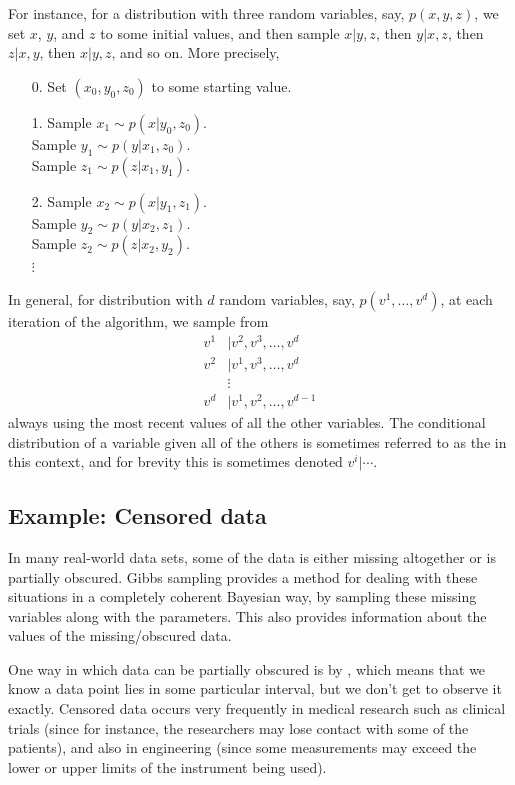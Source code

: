 \documentclass[12pt]{article}
\begin{document}
For instance, for a distribution with three random variables, say, $p(x,y,z)$, we set $x$, $y$, and $z$ to some initial values, and then sample $x|y,z$, then $y|x,z$, then $z|x,y$, then $x|y,z$, and so on. More precisely,
\begin{enumerate}
\item[0.] Set $(x_0,y_0,z_0)$ to some starting value.
\item[1.] Sample $x_1\sim p(x|y_0,z_0)$. \\
          Sample $y_1\sim p(y|x_1,z_0)$. \\
          Sample $z_1\sim p(z|x_1,y_1)$. \\
\item[2.] Sample $x_2\sim p(x|y_1,z_1)$. \\
          Sample $y_2\sim p(y|x_2,z_1)$. \\
          Sample $z_2\sim p(z|x_2,y_2)$. \\
        $\vdots$
\end{enumerate}

In general, for distribution with $d$ random variables, say, $p(v^1,\ldots,v^d)$, at each iteration of the algorithm, we sample from
\begin{align*}
v^1&\mid v^2,v^3,\ldots,v^d\\
v^2&\mid v^1,v^3,\ldots,v^d\\
&\vdots\\
v^d&\mid v^1,v^2,\ldots,v^{d-1}
\end{align*}
always using the most recent values of all the other variables. The conditional distribution of a variable given all of the others is sometimes referred to as the  in this context, and for brevity this is sometimes denoted $v^i|\cdots$.




\subsection{Example: Censored data}
In many real-world data sets, some of the data is either missing altogether or is partially obscured. Gibbs sampling provides a method for dealing with these situations in a completely coherent Bayesian way, by sampling these missing variables along with the parameters. This also provides information about the values of the missing/obscured data.

One way in which data can be partially obscured is by , which means that we know a data point lies in some particular interval, but we don't get to observe it exactly. Censored data occurs very frequently in medical research such as clinical trials (since for instance, the researchers may lose contact with some of the patients), and also in engineering (since some measurements may exceed the lower or upper limits of the instrument being used).
\end{document}
